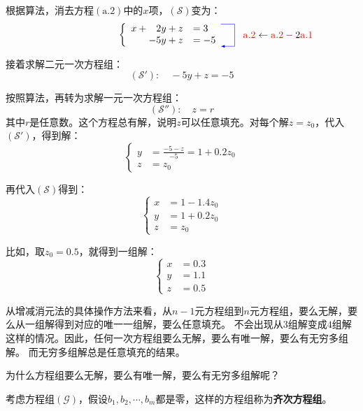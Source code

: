 \documentclass[12pt,UTF8,fontset=none]{ctexbook}
\begin{document}
\begin{so}
根据算法，消去方程$(\mathrm{a}.2)$中的$x$项，$(\mathcal{S})$变为：
$$ \qquad \qquad \qquad \qquad\qquad \left\{
    \begin{array}{rl}
x + \phantom{-}2y + z &= 3 \\
 - 5y + z &= -5  
\end{array}
\begin{tikzpicture}[baseline={([yshift=-.5ex]current bounding box.center)},>=latex]
    \draw[color=blue, ->] (.5,.4)--(1.0, .4)--(1.0,-.4)--(.5, -.4);
    \node[text width=3.4cm] at (3, 0.0) {${{\color{red}\mathrm{a}.2} \leftarrow {\color{red}\mathrm{a}.2} - 2\color{red}\mathrm{a}.1}$};
  \end{tikzpicture}
\right. $$

接着求解二元一次方程组：
$$ (\mathcal{S}'):\quad  - 5y + z = -5 $$

按照算法，再转为求解一元一次方程组：
$$ (\mathcal{S}''):\quad  z = r $$
其中$r$是任意数。这个方程总有解，说明$z$可以任意填充。对每个解$z = z_0$，代入$(\mathcal{S}')$，得到解：
$$ \left\{
    \begin{array}{rl}
        y &=\frac{-5 - z}{-5} = 1 + 0.2 z_0 \\
        z &= z_0 
    \end{array}
\right. $$

再代入$(\mathcal{S})$得到：
$$ \left\{
    \begin{array}{rl}
        x &= 1 - 1.4 z_0 \\
        y &= 1 + 0.2 z_0\\
        z &= z_0
    \end{array}
\right. $$

比如，取$z_0 = 0.5$，就得到一组解：
$$ \left\{
    \begin{array}{rl}
        x &= 0.3  \\
        y &= 1.1 \\
        z &= 0.5 
    \end{array}
\right. $$
    
\end{so}

从增减消元法的具体操作方法来看，从$n-1$元方程组到$n$元方程组，要么无解，要么从一组解得到对应的唯一一组解，要么任意填充。
不会出现从$3$组解变成$4$组解这样的情况。因此，任何一次方程组要么无解，要么有唯一解，要么有无穷多组解。
而无穷多组解总是任意填充的结果。

为什么方程组要么无解，要么有唯一解，要么有无穷多组解呢？

考虑方程组$(\mathcal{G})$，假设$b_1, b_2,\cdots, b_m$都是零，这样的方程组称为\textbf{齐次方程组}。
\end{document}
